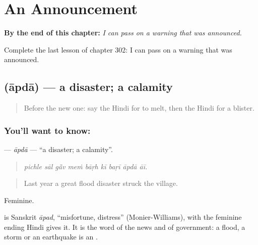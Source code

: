 
\chapter{An Announcement}
\label{ch:hi-an-announcement}

\begin{chapteropening}
\textbf{By the end of this chapter:} \emph{I can pass on a warning that was announced.}

Complete the last lesson of chapter 302: I can pass on a warning that was announced.
\end{chapteropening}

\section[\texorpdfstring{\hi{आपदा} (āpdā)}{आपदा (āpdā)}]{ (āpdā) — a disaster; a calamity}

\label{lesson:HI-C302-apda}



\begin{quote}
Before the new one: say the Hindi for to melt, then the Hindi for a blister.
\end{quote}

\subsection*{You'll want to know: }
\textbf{} — \emph{āpdā} — \textquotedblleft{}a disaster; a calamity\textquotedblright{}.

\begin{quote}
        
\end{quote}

\begin{quote}
\emph{pichle sāl gā̃v meṁ bāṛh kī baṛī āpdā āī.}
\end{quote}

\begin{quote}
Last year a great flood disaster struck the village.
\end{quote}

Feminine.

\begin{cousinweb}
is Sanskrit \emph{āpad}, \textquotedblleft{}misfortune, distress\textquotedblright{} (Monier-Williams), with the feminine ending Hindi gives it. It is the word of the news and of government: a flood, a storm or an earthquake is an \textbf{}.
\end{cousinweb}

